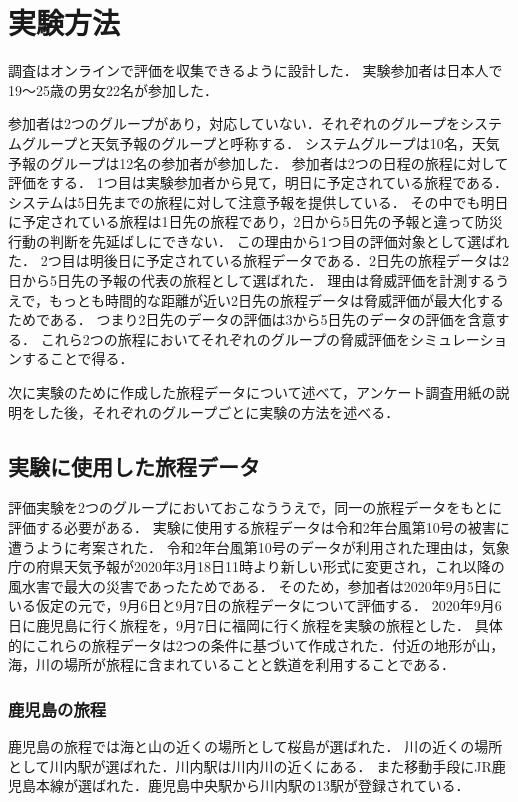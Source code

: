 \section{実験方法}
調査はオンラインで評価を収集できるように設計した．
実験参加者は日本人で19〜25歳の男女22名が参加した．\par
参加者は2つのグループがあり，対応していない．それぞれのグループをシステムグループと天気予報のグループと呼称する．
システムグループは10名，天気予報のグループは12名の参加者が参加した．
参加者は2つの日程の旅程に対して評価をする．
1つ目は実験参加者から見て，明日に予定されている旅程である．システムは5日先までの旅程に対して注意予報を提供している．
その中でも明日に予定されている旅程は1日先の旅程であり，2日から5日先の予報と違って防災行動の判断を先延ばしにできない．
この理由から1つ目の評価対象として選ばれた．
2つ目は明後日に予定されている旅程データである．2日先の旅程データは2日から5日先の予報の代表の旅程として選ばれた．
理由は脅威評価を計測するうえで，もっとも時間的な距離が近い2日先の旅程データは脅威評価が最大化するためである．
つまり2日先のデータの評価は3から5日先のデータの評価を含意する．
これら2つの旅程においてそれぞれのグループの脅威評価をシミュレーションすることで得る．\par
次に実験のために作成した旅程データについて述べて，アンケート調査用紙の説明をした後，それぞれのグループごとに実験の方法を述べる．

\subsection{実験に使用した旅程データ}
評価実験を2つのグループにおいておこなううえで，同一の旅程データをもとに評価する必要がある．
実験に使用する旅程データは令和2年台風第10号の被害に遭うように考案された．
令和2年台風第10号のデータが利用された理由は，気象庁の府県天気予報が2020年3月18日11時より新しい形式に変更され，これ以降の風水害で最大の災害であったためである．
そのため，参加者は2020年9月5日にいる仮定の元で，9月6日と9月7日の旅程データについて評価する．
2020年9月6日に鹿児島に行く旅程を，9月7日に福岡に行く旅程を実験の旅程とした．
具体的にこれらの旅程データは2つの条件に基づいて作成された．付近の地形が山，海，川の場所が旅程に含まれていることと鉄道を利用することである．

\subsubsection{鹿児島の旅程}
鹿児島の旅程では海と山の近くの場所として桜島が選ばれた．
川の近くの場所として川内駅が選ばれた．川内駅は川内川の近くにある．
また移動手段にJR鹿児島本線が選ばれた．鹿児島中央駅から川内駅の13駅が登録されている．

